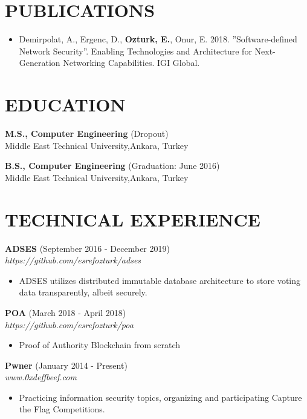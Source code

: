 \documentclass[margin, 10pt]{res} %
\begin{document}
\begin{resume}
        \section{PUBLICATIONS}
        \begin{itemize}
        		\item  Demirpolat, A., Ergenc, D., {\bf Ozturk, E.}, Onur, E. 2018. ”Software-defined Network Security”. Enabling Technologies and Architecture for Next-Generation Networking Capabilities. IGI Global.

        \end{itemize}
        


        \section{EDUCATION}

        {\bf M.S., Computer Engineering } \hfill {(Dropout)}\\
        Middle East Technical University,Ankara, Turkey

        {\bf B.S., Computer Engineering } \hfill {(Graduation: June 2016)}\\
        Middle East Technical University,Ankara, Turkey


        \section{TECHNICAL EXPERIENCE}

        {\bf ADSES} \hfill (September 2016 - December 2019) \\
        \textit{https://github.com/esrefozturk/adses}
        \begin{itemize}
            \item ADSES utilizes distributed immutable database architecture to store voting data transparently, albeit securely.
        \end{itemize}

        {\bf POA} \hfill (March 2018 - April 2018) \\
        \textit{https://github.com/esrefozturk/poa}
        \begin{itemize}
            \item Proof of Authority Blockchain from scratch
        \end{itemize}

        {\bf Pwner} \hfill (January 2014 - Present) \\
        \textit{www.0xdeffbeef.com}
        \begin{itemize}
            \item Practicing information security topics, organizing and participating Capture the Flag Competitions.
        \end{itemize}


\end{resume}
\end{document}
